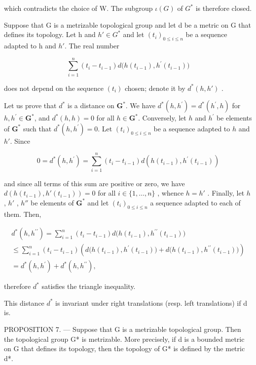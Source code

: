 which contradicts the choice of W. The subgroup \(\iota(G)\) of \(G^{*}\) is therefore closed.

Suppose that G is a metrizable topological group and let d be a metric on G that defines its topology. Let h and \(h' \in G^{*}\) and let \((t_{i})_{0 \leqslant i \leqslant n}\) be a sequence adapted to h and \(h'\). The real number

\[
\sum_ {i = 1} ^ {n} (t _ {i} - t _ {i - 1}) d \bigl (h (t _ {i - 1}), h ^ {\prime} (t _ {i - 1}) \bigr)
\]

does not depend on the sequence \((t_{i})\) chosen; denote it by \(d^{*}(h,h')\) .

Let us prove that \(d^{*}\) is a distance on \(\mathbf{G}^{*}\). We have \(d^{*}(h,h^{\prime}) = d^{*}(h^{\prime},h)\) for \(h, h^{\prime} \in \mathbf{G}^{*}\), and \(d^{*}(h,h) = 0\) for all \(h \in \mathbf{G}^{*}\). Conversely, let \(h\) and \(h^{\prime}\) be elements of \(\mathbf{G}^{*}\) such that \(d^{*}(h,h^{\prime}) = 0\). Let \((t_{i})_{0\leqslant i\leqslant n}\) be a sequence adapted to \(h\) and \(h'\). Since

\[
0 = d ^ {*} (h, h ^ {\prime}) = \sum_ {i = 1} ^ {n} \left(t _ {i} - t _ {i - 1}\right) d \left(h \left(t _ {i - 1}\right), h ^ {\prime} \left(t _ {i - 1}\right)\right)
\]

and since all terms of this sum are positive or zero, we have \(d(h(t_{i-1}), h'(t_{i-1})) = 0\) for all \(i \in \{1, \ldots, n\}\) , whence \(h = h'\) . Finally, let \(h\) , \(h'\) , \(h''\) be elements of \(\mathbf{G}^*\) and let \((t_i)_{0 \leqslant i \leqslant n}\) a sequence adapted to each of them. Then,

\[
\begin{array}{l} d ^ {*} (h, h ^ {\prime \prime}) = \sum_ {i = 1} ^ {n} (t _ {i} - t _ {i - 1}) d \big (h (t _ {i - 1}), h ^ {\prime \prime} (t _ {i - 1}) \big) \\ \leqslant \sum_ {i = 1} ^ {n} (t _ {i} - t _ {i - 1}) \left(d \big (h (t _ {i - 1}), h ^ {\prime} (t _ {i - 1}) \big) + d \big (h (t _ {i - 1}), h ^ {\prime \prime} (t _ {i - 1}) \big)\right) \\ = d ^ {*} (h, h ^ {\prime}) + d ^ {*} (h, h ^ {\prime \prime}), \end{array}
\]

therefore \(d^{*}\) satisfies the triangle inequality.

This distance \(d^{*}\) is invariant under right translations (resp. left translations) if d is.

PROPOSITION 7. --- Suppose that G is a metrizable topological group. Then the topological group G* is metrizable. More precisely, if d is a bounded metric on G that defines its topology, then the topology of G* is defined by the metric d*.

